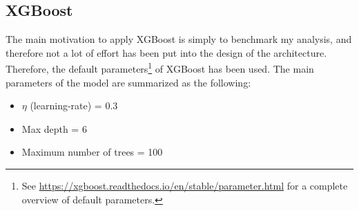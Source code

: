 \subsection*{XGBoost}\label{subsec:XGBoost}
The main motivation to apply XGBoost is simply to benchmark my analysis, and therefore not a lot of effort has been put into the design of the 
architecture. Therefore, the default parameters\footnote{See \href{https://xgboost.readthedocs.io/en/stable/parameter.html}
{https://xgboost.readthedocs.io/en/stable/parameter.html}
for a complete overview of default parameters.} of XGBoost has been used. The main parameters of the model are summarized as the following:
\begin{itemize}
    \item $\eta$ (learning-rate) = 0.3
    \item Max depth = 6
    \item Maximum number of trees = 100
\end{itemize}

